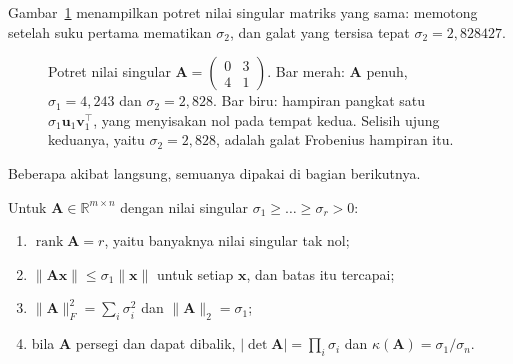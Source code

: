 Gambar~\ref{fig:potret-singular} menampilkan potret nilai singular matriks yang sama:
memotong setelah suku pertama mematikan $\sigma_{2}$, dan galat yang tersisa tepat
$\sigma_{2}=2{,}828427$.

\begin{figure}[htbp]
\centering
{}
\caption{Potret nilai singular $\mathbf{A}=\begin{pmatrix}0&3\\4&1\end{pmatrix}$.
Bar merah: $\mathbf{A}$ penuh, $\sigma_{1}=4{,}243$ dan $\sigma_{2}=2{,}828$. Bar
biru: hampiran pangkat satu $\sigma_{1}\mathbf{u}_{1}\mathbf{v}_{1}^{\top}$, yang
menyisakan nol pada tempat kedua. Selisih ujung keduanya, yaitu $\sigma_{2}=2{,}828$,
adalah galat Frobenius hampiran itu.}
\label{fig:potret-singular}
\end{figure}

Beberapa akibat langsung, semuanya dipakai di bagian berikutnya.

\begin{akibat}
Untuk $\mathbf{A}\in\mathbb{R}^{m\times n}$ dengan nilai singular
$\sigma_{1}\ge\dots\ge\sigma_{r}>0$:
\begin{enumerate}
  \item $\operatorname{rank}\mathbf{A}=r$, yaitu banyaknya nilai singular tak nol;
  \item $\|\mathbf{A}\mathbf{x}\|\le\sigma_{1}\|\mathbf{x}\|$ untuk setiap $\mathbf{x}$,
        dan batas itu tercapai;
  \item $\|\mathbf{A}\|_{F}^{2}=\sum_{i}\sigma_{i}^{2}$ dan
        $\|\mathbf{A}\|_{2}=\sigma_{1}$;
  \item bila $\mathbf{A}$ persegi dan dapat dibalik,
        $|\det\mathbf{A}|=\prod_{i}\sigma_{i}$ dan
        $\kappa(\mathbf{A})=\sigma_{1}/\sigma_{n}$.
\end{enumerate}
\end{akibat}

